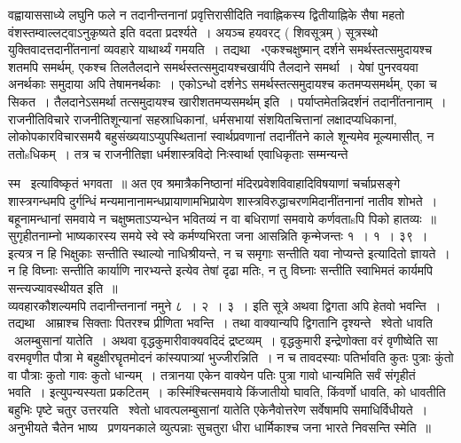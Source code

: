 \documentclass[11pt, openany]{book}
\begin{document}
वह्वायाससाध्ये लघुनि फले न तदानीन्तनानां प्रवृत्तिरासीदिति नवाह्निकस्य द्वितीयाह्निके {\qt सैषा महतो वंशस्तम्वाल्लट्वाऽनुकृष्यते इति वदता प्रदर्श्यते~। अयञ्च हयवरट् ( शिवसूत्रम् ) सूत्रस्थो युक्तिवादत्तदानींतनानां व्यवहारे याथार्थ्यं गमयति~। तद्यथा \textendash\ ॰एकश्चक्षुष्मान् दर्शने समर्थस्तत्समुदायश्च शतमपि समर्थम्, एकश्च तिलतैलदाने समर्थस्तत्समुदायश्चखार्यपि तैलदाने समर्था~। येषां पुनरवयवा अनर्थकाः समुदाया अपि तेषामनर्थकाः~। एकोऽन्धो दर्शनेऽ समर्थस्तत्समुदायश्च कतमप्यसमर्थम्, एका च सिकत~। तैलदानेऽसमर्था तत्समुदायश्च खारीशतमप्यसमर्थम्} इति~। पर्याप्तमेतन्निदर्शनं तदानींतनानाम्~। राजनीतिविचारे राजनीतिशून्यानां सहस्राधिकानां, धर्मसभायां संशयितचित्तानां लक्षादप्यधिकानां, लोकोपकारविचारसमयै बहुसंख्ययाऽप्युपस्थितानां स्वार्थप्रवणानां तदानींतने काले शून्यमेव मूल्यमासीत्, न ततोsधिकम्~। तत्र च राजनीतिज्ञा धर्मशास्त्रविदो निःस्वार्था एवाधिकृताः सम्मन्यन्ते

\newpage

\noindent
स्म \textendash\ इत्याविष्कृतं भगवता~॥ अत एव श्रमात्रैकनिष्ठानां मंदिरप्रवेशविवाहादिविषयाणां चर्चाप्रसङ्गे शास्त्रगन्धमपि दुर्गन्धिं मन्यमानानामन्धप्रायाणामभिप्रायेण शास्त्रविरुद्धाचरणमिदानींतनानां नातीव शोभते~। बहूनामन्धानां समवाये न चक्षुष्मताऽप्यन्धेन भवितव्यं न वा बधिराणां समवाये कर्णवताsपि पिको हातव्यः~॥\\

सुगृहीतनाम्नो भाष्यकारस्य समये स्वे स्वे कर्मण्यभिरता जना आसन्निति कृन्मेजन्तः १~। १~। ३९~। इत्यत्र {\qt न हि भिक्षुकाः सन्तीति स्थाल्यो नाधिश्रीयन्ते, न च समृगाः सन्तीति यवा नोप्यन्ते} इत्यादितो ज्ञायते~। न हि विघ्नाः सन्तीति कार्याणि नारभ्यन्ते इत्येव तेषां दृढा मतिः, न तु विघ्नाः सन्तीति स्वाभिमतं कार्यमपि सन्त्यज्यावस्थीयत इति~॥\\

व्यवहारकौशल्यमपि तदानीन्तनानां नमुने ८~। २~। ३~। इति सूत्रे अथवा द्विगता अपि हेतवो भवन्ति~। तद्यथा \textendash\ आम्राश्च सिक्ताः पितरश्च प्रीणिता भवन्ति~। तथा वाक्यान्यपि द्विगतानि दृश्यन्ते \textendash\ श्वेतो धावति \textendash\ अलम्बुसानां यातेति~। अथवा वृद्धकुमारीवाक्यवदिदं द्रष्टव्यम्~। वृद्धकुमारी इन्द्रेणोक्ता वरं वृणीष्वेति सा वरमवृणीत पौत्रा मे बहुक्षीरघॄतमोदनं कांस्यपात्र्यां भुज्जीरन्निति~। न च तावदस्याः पतिर्भावति कुतः पुत्राः कुंतो वा पौत्राः कुतो गावः कुतो धान्यम्~। तत्रानया एकेन वाक्येन पतिः पुत्रा गावो धान्यमिति सर्वं संगृहीतं भवति~। इत्युपन्यस्यता प्रकटितम्~। कस्मिंश्चित्समवाये किंजातीयो घावति, किंवर्णो धावति, को धावतीति बहुभिः पृष्टे चतुर उत्तरयति \textendash\ श्वेतो धावत्पलम्बुसानां यातेति एकेनैवोत्तरेण सर्वेषामपि समाधिर्विधीयते~। अनुभीयते चैतेन भाष्य \textendash\ प्रणयनकाले व्युत्पन्नाः सुचतुरा धीरा धार्मिकाश्च जना भारते निवसन्ति स्मेति~॥
\end{document}
